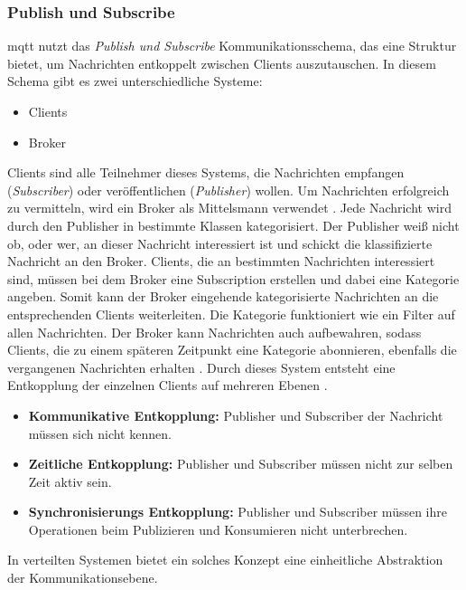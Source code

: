 \subsubsection{Publish und Subscribe} \label{s:publish-subscribe}
\ac{mqtt} nutzt das \textit{Publish und Subscribe} Kommunikationsschema, das eine Struktur bietet, um Nachrichten entkoppelt zwischen Clients auszutauschen. In diesem Schema gibt es zwei unterschiedliche Systeme:
\begin{itemize}
    \item Clients
    \item Broker
\end{itemize}
Clients sind alle Teilnehmer dieses Systems, die Nachrichten empfangen (\textit{Subscriber}) oder veröffentlichen (\textit{Publisher}) wollen. Um Nachrichten erfolgreich zu vermitteln, wird ein Broker als Mittelsmann verwendet \cite{teamGettingStartedMQTT}.
Jede Nachricht wird durch den Publisher in bestimmte Klassen kategorisiert. Der Publisher wei{\ss} nicht ob, oder wer, an dieser Nachricht interessiert ist und schickt die klassifizierte Nachricht an den Broker.
Clients, die an bestimmten Nachrichten interessiert sind, müssen bei dem Broker eine Subscription erstellen und dabei eine Kategorie angeben.
Somit kann der Broker eingehende kategorisierte Nachrichten an die entsprechenden Clients weiterleiten. Die Kategorie funktioniert wie ein Filter auf allen Nachrichten.
Der Broker kann Nachrichten auch aufbewahren, sodass Clients, die zu einem späteren Zeitpunkt eine Kategorie abonnieren, ebenfalls die vergangenen Nachrichten erhalten \cite{EverythingYouNeed}.
Durch dieses System entsteht eine Entkopplung der einzelnen Clients auf mehreren Ebenen \cite{teamPublishSubscribeMQTT}.
\begin{itemize}
    \item \textbf{Kommunikative Entkopplung:} Publisher und Subscriber der Nachricht müssen sich nicht kennen.
    \item \textbf{Zeitliche Entkopplung:} Publisher und Subscriber müssen nicht zur selben Zeit aktiv sein.
    \item \textbf{Synchronisierungs Entkopplung:} Publisher und Subscriber müssen ihre Operationen beim Publizieren und Konsumieren nicht unterbrechen.
\end{itemize}
In verteilten Systemen bietet ein solches Konzept eine einheitliche Abstraktion der Kommunikationsebene.
\cite{domingusDistributedSystemsIntroduction2020}
